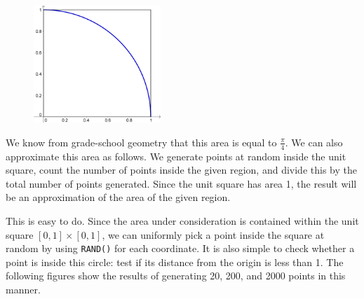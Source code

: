\begin{figure}
	\centering
	\includegraphics[width=4.8cm]{fig/4_quartercircle.png}
	\caption{\label{fig:4_quartercircle}}
\end{figure}

We know from grade-school geometry that this area is equal to $\frac{\pi}{4}$.
We can also approximate this area as follows.
We generate points at random inside the unit square, count the number of points inside the given region, and divide this by the total number of points generated.
Since the unit square has area 1, the result will be an approximation of the area of the given region.

This is easy to do.
Since the area under consideration is contained within the unit square $[0,1] \times [0,1]$, we can uniformly pick a point inside the square at random by using \texttt{RAND()} for each coordinate.
It is also simple to check whether a point is inside this circle: test if its distance from the origin is less than 1.
The following figures show the results of generating 20, 200, and 2000 points in this manner.

